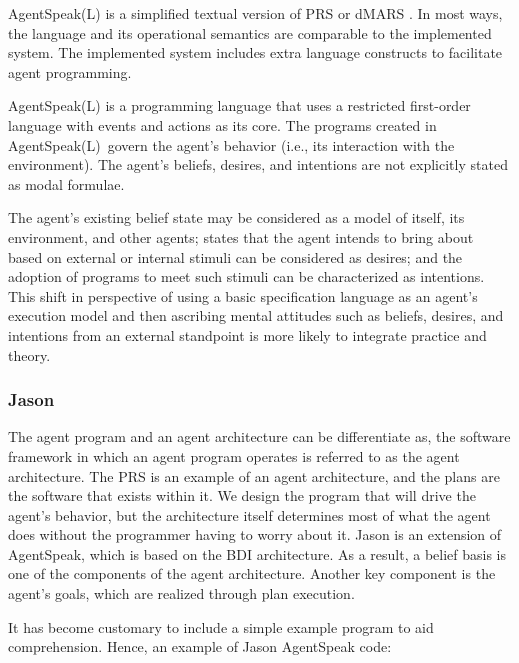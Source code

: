 AgentSpeak(L) is a simplified textual version of \ac{PRS} \cite{prs} or \ac{dMARS} \cite{dmars}. In most ways, the language and its operational semantics are comparable to the implemented system. The implemented system includes extra language constructs to facilitate agent programming.

\vspace{.5cm}

AgentSpeak(L) is a programming language that uses a restricted first-order language with events and actions as its core. The programs created in AgentSpeak(L) govern the agent's behavior (i.e., its interaction with the environment). The agent's beliefs, desires, and intentions are not explicitly stated as modal formulae.

\vspace{.5cm}

The agent's existing belief state may be considered as a model of itself, its environment, and other agents; states that the agent intends to bring about based on external or internal stimuli can be considered as desires; and the adoption of programs to meet such stimuli can be characterized as intentions. This shift in perspective of using a basic specification language as an agent's execution model and then ascribing mental attitudes such as beliefs, desires, and intentions from an external standpoint is more likely to integrate practice and theory.

\subsubsection{Jason}

The agent program and an agent architecture can be differentiate as, the software framework in which an agent program operates is referred to as the agent architecture. The \ac{PRS} is an example of an agent architecture, and the plans are the software that exists within it. We design the program that will drive the agent's behavior, but the architecture itself determines most of what the agent does without the programmer having to worry about it. Jason is an extension of AgentSpeak, which is based on the \ac{BDI} architecture. As a result, a belief basis is one of the components of the agent architecture. Another key component is the agent's goals, which are realized through plan execution.

\vspace{.5cm}

It has become customary to include a simple example program to aid comprehension. Hence, an example of Jason AgentSpeak code:

